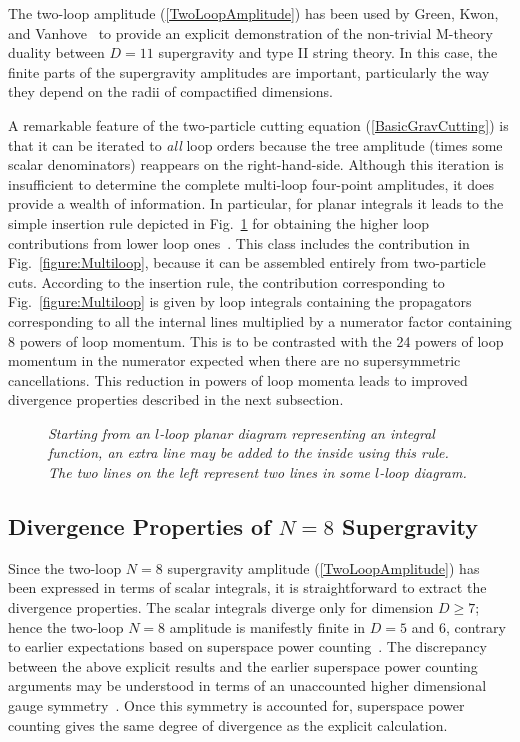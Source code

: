 The two-loop amplitude (\ref{TwoLoopAmplitude}) has been used by
Green, Kwon, and Vanhove~\cite{GreenTwoLoop} to provide an explicit
demonstration of the non-trivial M-theory duality between $D=11$
supergravity and type II string theory.  In this case, the finite
parts of the supergravity amplitudes are important, particularly the
way they depend on the radii of compactified dimensions.

A remarkable feature of the two-particle cutting equation
(\ref{BasicGravCutting}) is that it can be iterated to {\it all} loop
orders because the tree amplitude (times some scalar denominators)
reappears on the right-hand-side. Although this iteration is
insufficient to determine the complete multi-loop four-point
amplitudes, it does provide a wealth of information.  In particular,
for planar integrals it leads to the simple insertion rule depicted in
Fig.~\ref{figure:InsertLine} for obtaining the higher loop
contributions from lower loop ones~\cite{BDDPR}.  This class includes
the contribution in Fig.~\ref{figure:Multiloop}, because it can be
assembled entirely from two-particle cuts.  According to the insertion
rule, the contribution corresponding to Fig.~\ref{figure:Multiloop} is
given by loop integrals containing the propagators corresponding to
all the internal lines multiplied by a numerator factor containing 8
powers of loop momentum.  This is to be contrasted with the 24 
powers of loop momentum in the numerator expected when there are no
supersymmetric cancellations.  This reduction in powers of loop
momenta leads to improved divergence properties
described in the next subsection.


\begin{figure}[h]
  \def\epsfsize#1#2{0.5#1} \centerline{}
  \caption{\it Starting from an $l$-loop planar diagram representing
  an integral function, an extra line may be added to the inside using
  this rule.  The two lines on the left represent two lines in
  some $l$-loop diagram.}  \label{figure:InsertLine}
\end{figure}


\subsection{Divergence Properties of $N=8$ Supergravity}
\label{subsection:divergences}

Since the two-loop $N=8$ supergravity amplitude
(\ref{TwoLoopAmplitude}) has been expressed in terms of scalar
integrals, it is straightforward to extract the divergence properties.
The scalar integrals diverge only for dimension $D\ge 7$; hence the
two-loop $N=8$ amplitude is manifestly finite in $D=5$ and $6$,
contrary to earlier expectations based on superspace
power counting~\cite{Howe89}.  The discrepancy between the above
explicit results and the earlier superspace power counting arguments
may be understood in terms of an unaccounted higher dimensional gauge
symmetry~\cite{Stelle}. Once this symmetry is accounted for,
superspace power counting gives the same degree of divergence as the
explicit calculation.

